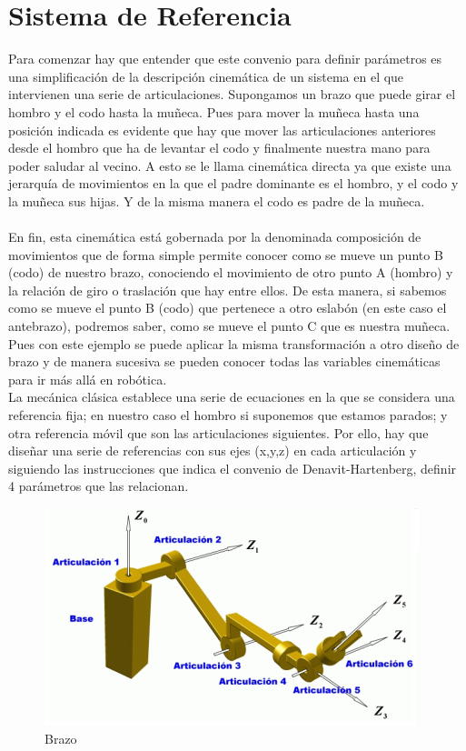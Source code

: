 \documentclass[12pt,a4paper]{report}
\begin{document}
\section{Sistema de Referencia}
Para comenzar hay que entender que este convenio para definir parámetros es una simplificación de la descripción cinemática de un sistema en el que intervienen una serie de articulaciones.
Supongamos un brazo que puede girar el hombro y el codo hasta la muñeca. Pues para mover la muñeca hasta una posición indicada es evidente que hay que mover las articulaciones anteriores desde el hombro que ha de levantar el codo y finalmente nuestra mano para poder saludar al vecino. A esto se le llama cinemática directa ya que existe una jerarquía de movimientos en la que el padre dominante es el hombro, y el codo y la muñeca sus hijas. Y de la misma manera el codo es padre de la muñeca.\\
\noindent\\
En fin, esta cinemática está gobernada por la denominada composición de movimientos que de forma simple permite conocer como se mueve un punto B (codo) de nuestro brazo, conociendo el movimiento de otro punto A (hombro) y la relación de giro o traslación que hay entre ellos. De esta manera, si sabemos como se mueve el punto B (codo) que pertenece a otro eslabón (en este caso el antebrazo), podremos saber, como se mueve el punto C que es nuestra muñeca.\\
Pues con este ejemplo se puede aplicar la misma transformación a otro diseño de brazo y de manera sucesiva se pueden conocer todas las variables cinemáticas para ir más allá en robótica.\\
La mecánica clásica establece una serie de ecuaciones en la que se considera una referencia fija; en nuestro caso el hombro si suponemos que estamos parados; y otra referencia móvil que son las articulaciones siguientes. Por ello, hay que diseñar una serie de referencias con sus ejes (x,y,z) en cada articulación y siguiendo las instrucciones que indica el convenio de Denavit-Hartenberg, definir 4 parámetros que las relacionan.\\


\begin{figure}
  \centering
    \includegraphics{Robot.png}
  \caption{Brazo}
  \label{fig:Tabla}
\end{figure}
\end{document}
